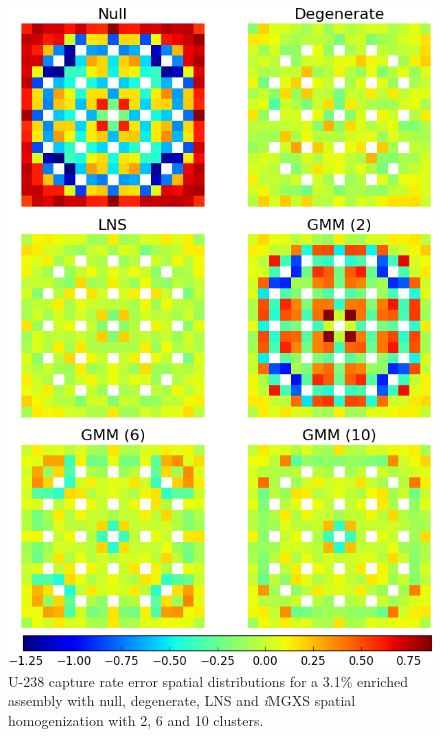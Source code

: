 \begin{figure}[h!]
\centering
\includegraphics[width=0.9\linewidth]{figures/results/spatial/assm-31/capt-err}
\vspace{2mm}
\caption[U-238 capture rate errors for a 3.1\% enriched assembly]{U-238 capture rate error spatial distributions for a 3.1\% enriched assembly with null, degenerate, \ac{LNS} and \textit{i}\ac{MGXS} spatial homogenization with 2, 6 and 10 clusters.}
\label{fig:chap11-assm-3.1-capt-rates}
\end{figure}

\clearpage

